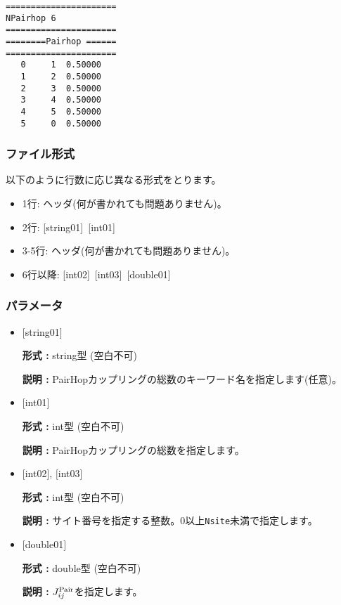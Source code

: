 \begin{minipage}{12.5cm}
\begin{screen}
\begin{verbatim}
====================== 
NPairhop 6  
====================== 
========Pairhop ====== 
====================== 
   0     1  0.50000
   1     2  0.50000
   2     3  0.50000
   3     4  0.50000
   4     5  0.50000
   5     0  0.50000
\end{verbatim}
\end{screen}
\end{minipage}

\subsubsection{ファイル形式}
以下のように行数に応じ異なる形式をとります。
 \begin{itemize}
   \item  1行:  ヘッダ(何が書かれても問題ありません)。
   \item  2行:   [string01]~[int01]
   \item  3-5行:  ヘッダ(何が書かれても問題ありません)。
   \item  6行以降:
   [int02]~[int03]~[double01] 
  \end{itemize}
\subsubsection{パラメータ}
 \begin{itemize}

   \item  $[$string01$]$
   
    {\bf 形式 :} string型 (空白不可)

   {\bf 説明 :} PairHopカップリングの総数のキーワード名を指定します(任意)。

   \item  $[$int01$]$
   
    {\bf 形式 :} int型 (空白不可)

   {\bf 説明 :} PairHopカップリングの総数を指定します。

  \item  $[$int02$]$, $[$int03$]$
  
 {\bf 形式 :} int型 (空白不可)

{\bf 説明 :} サイト番号を指定する整数。0以上\verb|Nsite|{未満}で指定します。
 
 \item  $[$double01$]$
   
   {\bf 形式 :} double型 (空白不可)

  {\bf 説明 :}  $J_{ij}^{\rm Pair}$を指定します。
  
\end{itemize}

